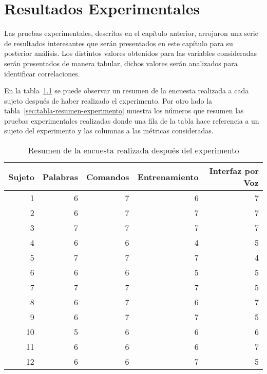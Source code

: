 \chapter{Resultados Experimentales}
\label{sec:resultados}


Las pruebas experimentales, descritas en el cap\'itulo anterior, arrojaron una serie de
resultados interesantes que ser\'an presentados en este cap\'itulo para su posterior an\'alisis. Los
distintos valores obtenidos para las variables consideradas ser\'an presentados de manera tabular, dichos
valores ser\'an analizados para identificar correlaciones.

En la tabla~\ref{sec:tabla-encuesta}
se puede observar un resumen de la encuesta realizada a cada sujeto despu\'es de haber realizado el experimento. Por otro lado
la tabla~\ref{sec:tabla-resumen-experimento} muestra los n\'umeros que resumen las pruebas experimentales realizadas donde 
una fila de la tabla hace referencia a un sujeto del experimento y 
las columnas a las m\'etricas consideradas.

\begin{table}[H]
\centering
\footnotesize
\begin{tabular}{|r|r|r|r|r|}
\hline
    Sujeto & Palabras & Comandos & Entrenamiento & Interfaz por Voz \\
\hline
    1 & 6 & 7 & 6 & 7 \\
    2 & 6 & 7 & 7 & 7 \\
    3 & 7 & 7 & 7 & 7 \\
    4 & 6 & 6 & 4 & 5 \\
    5 & 7 & 7 & 7 & 4 \\
    6 & 6 & 6 & 5 & 5 \\
    7 & 7 & 7 & 7 & 5 \\
    8 & 6 & 7 & 6 & 7  \\
    9 & 6 & 7 & 7 & 5  \\
    10 & 5 & 6 & 6 & 6  \\
    11 & 6 & 6 & 6 & 7  \\
    12 & 6 & 6 & 7 & 5  \\
\hline
\end{tabular}
\caption{Resumen de la encuesta realizada despu\'es del experimento}
\label{sec:tabla-encuesta}
\end{table}

